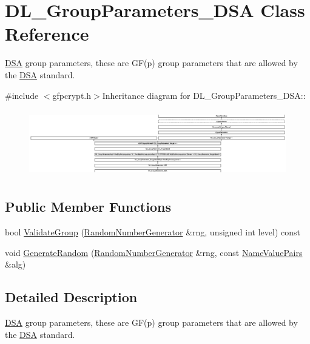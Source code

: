 \hypertarget{class_d_l___group_parameters___d_s_a}{
\section{DL\_\-GroupParameters\_\-DSA Class Reference}
\label{class_d_l___group_parameters___d_s_a}
}


\hyperlink{struct_d_s_a}{DSA} group parameters, these are GF(p) group parameters that are allowed by the \hyperlink{struct_d_s_a}{DSA} standard.  


{\ttfamily \#include $<$gfpcrypt.h$>$}Inheritance diagram for DL\_\-GroupParameters\_\-DSA::\begin{figure}[H]
\begin{center}
\leavevmode
\includegraphics[height=2.94455cm]{class_d_l___group_parameters___d_s_a}
\end{center}
\end{figure}
\subsection*{Public Member Functions}
\begin{DoxyCompactItemize}
\item 
bool \hyperlink{class_d_l___group_parameters___d_s_a_a1161018a8f95f1ac818272c571a52775}{ValidateGroup} (\hyperlink{class_random_number_generator}{RandomNumberGenerator} \&rng, unsigned int level) const 
\item 
void \hyperlink{class_d_l___group_parameters___d_s_a_ac83d3668c342b3a1fb367ed7785e27a3}{GenerateRandom} (\hyperlink{class_random_number_generator}{RandomNumberGenerator} \&rng, const \hyperlink{class_name_value_pairs}{NameValuePairs} \&alg)
\end{DoxyCompactItemize}


\subsection{Detailed Description}
\hyperlink{struct_d_s_a}{DSA} group parameters, these are GF(p) group parameters that are allowed by the \hyperlink{struct_d_s_a}{DSA} standard. 

